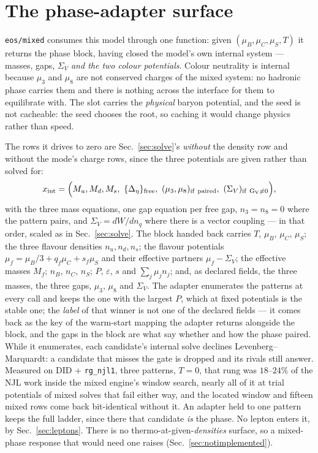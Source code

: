 \documentclass[aps,prc,onecolumn,superscriptaddress,nofootinbib,10pt]{revtex4-2}
\newcommand{\nB}{n_B}
\newcommand{\nC}{n_C}
\newcommand{\nS}{n_S}
\newcommand{\nq}{n_q}
\newcommand{\muB}{\mu_B}
\newcommand{\muC}{\mu_C}
\newcommand{\muS}{\mu_S}
\newcommand{\GV}{G_V}
\begin{document}
\section{The phase-adapter surface}
\label{sec:adapter}

\texttt{eos/mixed} consumes this model through one function: given
$(\muB, \muC, \muS, T)$ it returns the phase block, having closed the model's
own internal system --- masses, gaps, $\Sigma_V$ \emph{and the two colour
potentials}. Colour neutrality is internal because $\mu_3$ and $\mu_8$ are not
conserved charges of the mixed system: no hadronic phase carries them and there
is nothing across the interface for them to equilibrate with. The slot carries
the \emph{physical} baryon potential, and the seed is not cacheable: the seed
chooses the root, so caching it would change physics rather than speed.

The rows it drives to zero are Sec.~\ref{sec:solve}'s \emph{without} the
density row and without the mode's charge rows, since the three potentials are
given rather than solved for:
\begin{equation}
  x_{\rm int} = \Big( M_u, M_d, M_s,\ \{\Delta_\eta\}_{\rm free},\
  (\mu_3, \mu_8)_{\rm if\ paired},\ (\Sigma_V)_{\rm if\ \GV \neq 0} \Big) ,
\end{equation}
with the three mass equations, one gap equation per free gap, $n_3 = n_8 = 0$
where the pattern pairs, and $\Sigma_V = dW/d\nq$ where there is a vector
coupling --- in that order, scaled as in Sec.~\ref{sec:solve}. The block
handed back carries $T$, $\muB$, $\muC$, $\muS$; the three flavour densities
$n_u, n_d, n_s$; the flavour potentials
$\mu_f = \muB/3 + q_f \muC + s_f \muS$ and their effective partners
$\mu_f - \Sigma_V$; the effective masses $M_f$; $\nB$, $\nC$, $\nS$; $P$,
$\varepsilon$, $s$ and $\sum_j \mu_j n_j$; and, as declared fields, the three
masses, the three gaps, $\mu_3$, $\mu_8$ and $\Sigma_V$. The adapter
enumerates the patterns at every call and keeps the one with the largest $P$,
which at fixed potentials is the stable one; the \emph{label} of that winner
is not one of the declared fields --- it comes back as the key of the
warm-start mapping the adapter returns alongside the block, and the gaps in the
block are what say whether and how the phase paired. While it enumerates, each
candidate's internal solve declines Levenberg--Marquardt: a candidate that
misses the gate is dropped and its rivals still answer. Measured on DID +
\texttt{rg\_njl1}, three patterns, $T = 0$, that rung was $18$--$24\%$ of the NJL
work inside the mixed engine's window search, nearly all of it at trial
potentials of mixed solves that fail either way, and the located window and
fifteen mixed rows come back bit-identical without it. An adapter held to one
pattern keeps the full ladder, since there that candidate \emph{is} the phase. No lepton enters it, by
Sec.~\ref{sec:leptons}. There is no thermo-at-given-\emph{densities} surface,
so a mixed-phase response that would need one raises
(Sec.~\ref{sec:notimplemented}).
\end{document}
